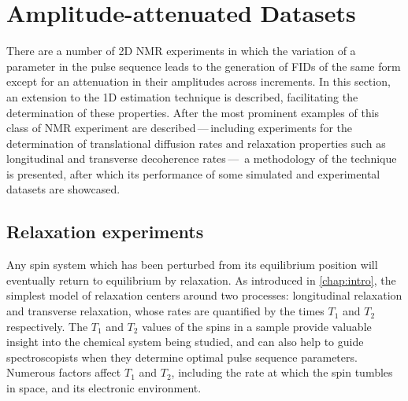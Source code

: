 \section{Amplitude-attenuated Datasets}
\label{sec:seq}
There are a number of \ac{2D} \ac{NMR} experiments in which the
variation of a parameter in the pulse sequence leads to the generation of
\acp{FID} of the same form except for an attenuation in their amplitudes across
increments.  In this section, an extension to the \ac{1D} estimation
technique is described, facilitating the determination of these properties.
After the most prominent examples of this class of \ac{NMR} experiment are
described\,---\,including experiments for the determination of translational
diffusion rates and relaxation properties such as longitudinal and transverse
decoherence rates\,---\, a methodology of the technique is presented, after
which its performance of some simulated and experimental datasets are
showcased.

\subsection{Relaxation experiments}
\label{subsec:relaxation_experiments}
Any spin system which has been perturbed from its equilibrium position will
eventually return to equilibrium by relaxation. As introduced in
\cref{chap:intro}, the simplest model of relaxation centers around two
processes: longitudinal relaxation and transverse relaxation, whose rates are
quantified by the times $T_1$ and  $T_2$ respectively.
The $T_1$ and $T_2$ values of the spins in a sample provide valuable insight
into the chemical system being studied, and can also help to guide spectroscopists
when they determine optimal pulse sequence parameters.
Numerous factors affect $T_1$ and  $T_2$, including the rate at which the spin
tumbles in space, and its electronic environment.


